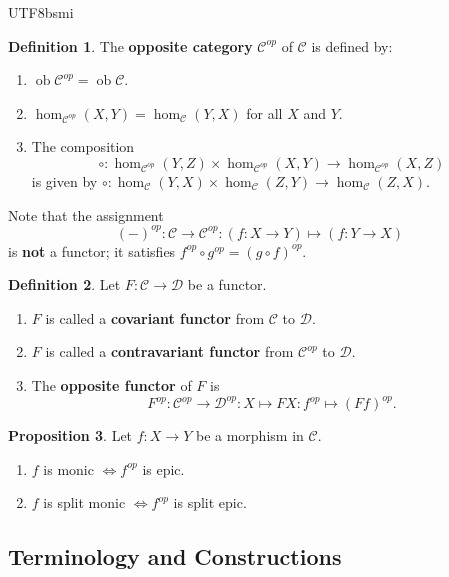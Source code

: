 \documentclass[12pt]{article}
\theoremstyle{definition}
\newtheorem{definition}{Definition}[section]
\newtheorem{property}[definition]{Proposition}
\newcommand\<{\langle}
\renewcommand\>{\rangle}
\DeclareMathOperator{\ob}{ob}
\begin{document}
\begin{CJK}{UTF8}{bsmi}
\begin{definition}
    The \textbf{opposite category} $\mathcal{C}^{op}$ of $\mathcal{C}$ is defined by:
    \begin{enumerate}
        \item $\ob\mathcal{C}^{op}=\ob\mathcal{C}$.
        \item $\hom_{\mathcal{C}^{op}}(X, Y)=\hom_\mathcal{C}(Y, X)$ for all $X$ and $Y$.
        \item The composition $$\circ:\hom_{\mathcal{C}^{op}}(Y, Z)\times\hom_{\mathcal{C}^{op}}(X, Y)\to\hom_{\mathcal{C}^{op}}(X, Z)$$ is given by $\circ:\hom_\mathcal{C}(Y, X)\times\hom_\mathcal{C}(Z, Y)\to\hom_\mathcal{C}(Z, X)$.
    \end{enumerate}
\end{definition}

Note that the assignment
\[
    (-)^{op}:\mathcal{C}\to\mathcal{C}^{op}:(f:X\to Y)\mapsto(f:Y\to X)
\]
is \textbf{not} a functor; it satisfies $f^{op}\circ g^{op}=(g\circ f)^{op}$.

\begin{definition}
    Let $F:\mathcal{C}\to\mathcal{D}$ be a functor.
    \begin{enumerate}
        \item $F$ is called a \textbf{covariant functor} from $\mathcal{C}$ to $\mathcal{D}$.
        \item $F$ is called a \textbf{contravariant functor} from $\mathcal{C}^{op}$ to $\mathcal{D}$.
        \item The \textbf{opposite functor} of $F$ is
        \[
            F^{op}:\mathcal{C}^{op}\to\mathcal{D}^{op}:X\mapsto FX:f^{op}\mapsto(Ff)^{op}.
        \]
    \end{enumerate}
\end{definition}

\begin{property}
    Let $f:X\to Y$ be a morphism in $\mathcal{C}$.
    \begin{enumerate}
        \item $f$ is monic $\iff f^{op}$ is epic.
        \item $f$ is split monic $\iff f^{op}$ is split epic.
    \end{enumerate}
\end{property}

\subsection{Terminology and Constructions}


\end{CJK}
\end{document}
